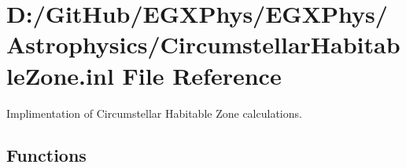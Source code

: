 \hypertarget{_circumstellar_habitable_zone_8inl}{}\section{D\+:/\+Git\+Hub/\+E\+G\+X\+Phys/\+E\+G\+X\+Phys/\+Astrophysics/\+Circumstellar\+Habitable\+Zone.inl File Reference}
\label{_circumstellar_habitable_zone_8inl}


Implimentation of Circumstellar Habitable Zone calculations.  


\subsection*{Functions}
